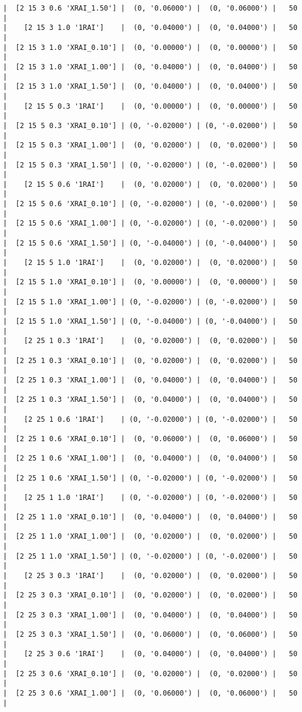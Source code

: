 \documentclass{article}
\begin{document}
\begin{verbatim}
|  [2 15 3 0.6 'XRAI_1.50'] |  (0, '0.06000') |  (0, '0.06000') |   50  |
|    [2 15 3 1.0 '1RAI']    |  (0, '0.04000') |  (0, '0.04000') |   50  |
|  [2 15 3 1.0 'XRAI_0.10'] |  (0, '0.00000') |  (0, '0.00000') |   50  |
|  [2 15 3 1.0 'XRAI_1.00'] |  (0, '0.04000') |  (0, '0.04000') |   50  |
|  [2 15 3 1.0 'XRAI_1.50'] |  (0, '0.04000') |  (0, '0.04000') |   50  |
|    [2 15 5 0.3 '1RAI']    |  (0, '0.00000') |  (0, '0.00000') |   50  |
|  [2 15 5 0.3 'XRAI_0.10'] | (0, '-0.02000') | (0, '-0.02000') |   50  |
|  [2 15 5 0.3 'XRAI_1.00'] |  (0, '0.02000') |  (0, '0.02000') |   50  |
|  [2 15 5 0.3 'XRAI_1.50'] | (0, '-0.02000') | (0, '-0.02000') |   50  |
|    [2 15 5 0.6 '1RAI']    |  (0, '0.02000') |  (0, '0.02000') |   50  |
|  [2 15 5 0.6 'XRAI_0.10'] | (0, '-0.02000') | (0, '-0.02000') |   50  |
|  [2 15 5 0.6 'XRAI_1.00'] | (0, '-0.02000') | (0, '-0.02000') |   50  |
|  [2 15 5 0.6 'XRAI_1.50'] | (0, '-0.04000') | (0, '-0.04000') |   50  |
|    [2 15 5 1.0 '1RAI']    |  (0, '0.02000') |  (0, '0.02000') |   50  |
|  [2 15 5 1.0 'XRAI_0.10'] |  (0, '0.00000') |  (0, '0.00000') |   50  |
|  [2 15 5 1.0 'XRAI_1.00'] | (0, '-0.02000') | (0, '-0.02000') |   50  |
|  [2 15 5 1.0 'XRAI_1.50'] | (0, '-0.04000') | (0, '-0.04000') |   50  |
|    [2 25 1 0.3 '1RAI']    |  (0, '0.02000') |  (0, '0.02000') |   50  |
|  [2 25 1 0.3 'XRAI_0.10'] |  (0, '0.02000') |  (0, '0.02000') |   50  |
|  [2 25 1 0.3 'XRAI_1.00'] |  (0, '0.04000') |  (0, '0.04000') |   50  |
|  [2 25 1 0.3 'XRAI_1.50'] |  (0, '0.04000') |  (0, '0.04000') |   50  |
|    [2 25 1 0.6 '1RAI']    | (0, '-0.02000') | (0, '-0.02000') |   50  |
|  [2 25 1 0.6 'XRAI_0.10'] |  (0, '0.06000') |  (0, '0.06000') |   50  |
|  [2 25 1 0.6 'XRAI_1.00'] |  (0, '0.04000') |  (0, '0.04000') |   50  |
|  [2 25 1 0.6 'XRAI_1.50'] | (0, '-0.02000') | (0, '-0.02000') |   50  |
|    [2 25 1 1.0 '1RAI']    | (0, '-0.02000') | (0, '-0.02000') |   50  |
|  [2 25 1 1.0 'XRAI_0.10'] |  (0, '0.04000') |  (0, '0.04000') |   50  |
|  [2 25 1 1.0 'XRAI_1.00'] |  (0, '0.02000') |  (0, '0.02000') |   50  |
|  [2 25 1 1.0 'XRAI_1.50'] | (0, '-0.02000') | (0, '-0.02000') |   50  |
|    [2 25 3 0.3 '1RAI']    |  (0, '0.02000') |  (0, '0.02000') |   50  |
|  [2 25 3 0.3 'XRAI_0.10'] |  (0, '0.02000') |  (0, '0.02000') |   50  |
|  [2 25 3 0.3 'XRAI_1.00'] |  (0, '0.04000') |  (0, '0.04000') |   50  |
|  [2 25 3 0.3 'XRAI_1.50'] |  (0, '0.06000') |  (0, '0.06000') |   50  |
|    [2 25 3 0.6 '1RAI']    |  (0, '0.04000') |  (0, '0.04000') |   50  |
|  [2 25 3 0.6 'XRAI_0.10'] |  (0, '0.02000') |  (0, '0.02000') |   50  |
|  [2 25 3 0.6 'XRAI_1.00'] |  (0, '0.06000') |  (0, '0.06000') |   50  |

\end{verbatim}
\end{document}
